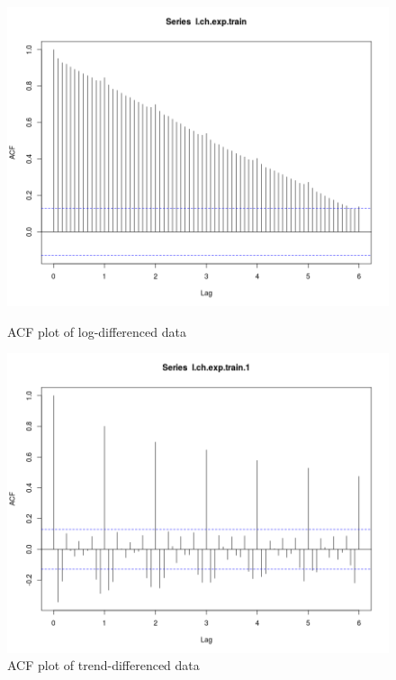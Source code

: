\documentclass[]{article}
\begin{document}
\begin{figure}[!ht]
\centering
\begin{minipage}{.5\textwidth}
\centering
\includegraphics[width=\linewidth]{acf_sarima}
\caption{ACF plot of log-differenced data}
\label{acf_sarima}
\end{minipage}%
\begin{minipage}{.5\textwidth}
\centering
\includegraphics[width=\linewidth]{acf1_sarima}
\caption{ACF plot of trend-differenced data}
\label{acf1_sarima}
\end{minipage}
\end{figure}
\end{document}
